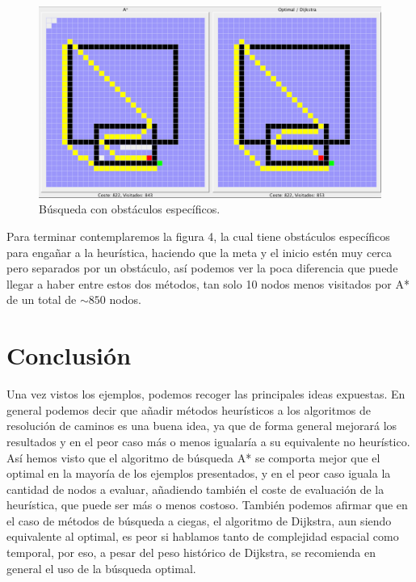 \documentclass{article}
\begin{document}
\begin{figure}[h!]
    \caption{Búsqueda con obstáculos específicos.}
    \includegraphics[width=\textwidth]{resources/versus4}
\end{figure}

Para terminar contemplaremos la figura 4, la cual tiene obstáculos específicos para engañar a la heurística, haciendo que la meta y el inicio estén muy cerca pero separados por un obstáculo, así podemos ver la poca diferencia que puede llegar a haber entre estos dos métodos, tan solo 10 nodos menos visitados por A* de un total de $\sim 850$ nodos.

\section{Conclusión}
Una vez vistos los ejemplos, podemos recoger las principales ideas expuestas. En general podemos decir que añadir métodos heurísticos a los algoritmos de resolución de caminos es una buena idea, ya que de forma general mejorará los resultados y en el peor caso más o menos igualaría a su equivalente no heurístico. Así hemos visto que el algoritmo de búsqueda A* se comporta mejor que el optimal en la mayoría de los ejemplos presentados, y en el peor caso iguala la cantidad de nodos a evaluar, añadiendo también el coste de evaluación de la heurística, que puede ser más o menos costoso. También podemos afirmar que en el caso de métodos de búsqueda a ciegas, el algoritmo de Dijkstra, aun siendo equivalente al optimal, es peor si hablamos tanto de complejidad espacial como temporal, por eso, a pesar del peso histórico de Dijkstra, se recomienda en general el uso de la búsqueda optimal.




\nocite{*}
\end{document}

